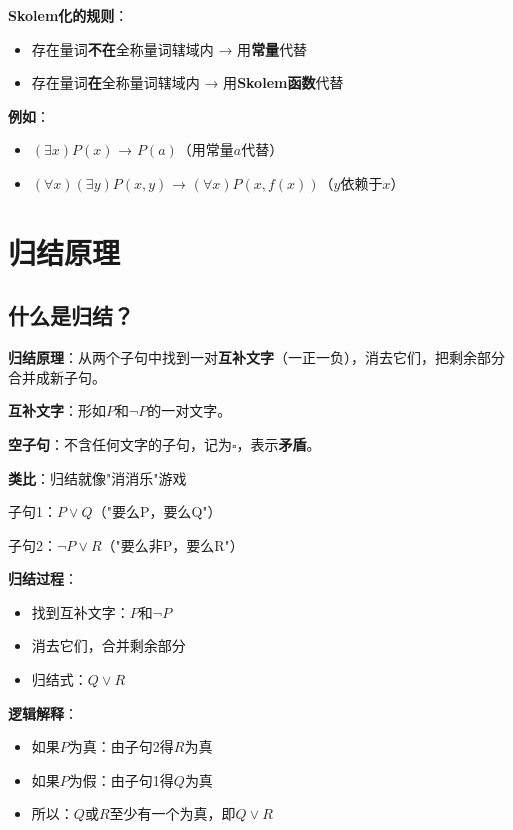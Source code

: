 \begin{tipbox}
\textbf{Skolem化的规则}：
\begin{itemize}[itemsep=0pt]
    \item 存在量词\textbf{不在}全称量词辖域内 → 用\textbf{常量}代替
    \item 存在量词\textbf{在}全称量词辖域内 → 用\textbf{Skolem函数}代替
\end{itemize}

\textbf{例如}：
\begin{itemize}[itemsep=0pt]
    \item $(\exists x)P(x)$ → $P(a)$（用常量$a$代替）
    \item $(\forall x)(\exists y)P(x,y)$ → $(\forall x)P(x,f(x))$（$y$依赖于$x$）
\end{itemize}
\end{tipbox}

\section{归结原理}

\subsection{什么是归结？}

\begin{conceptbox}
\textbf{归结原理}：从两个子句中找到一对\textbf{互补文字}（一正一负），消去它们，把剩余部分合并成新子句。

\textbf{互补文字}：形如$P$和$\neg P$的一对文字。

\textbf{空子句}：不含任何文字的子句，记为$\square$，表示\textbf{矛盾}。
\end{conceptbox}

\begin{examplebox}[例子：归结的直观理解]
\textbf{类比}：归结就像"消消乐"游戏

子句1：$P \lor Q$（"要么P，要么Q"）

子句2：$\neg P \lor R$（"要么非P，要么R"）

\textbf{归结过程}：
\begin{itemize}[itemsep=0pt]
    \item 找到互补文字：$P$和$\neg P$
    \item 消去它们，合并剩余部分
    \item 归结式：$Q \lor R$
\end{itemize}

\textbf{逻辑解释}：
\begin{itemize}[itemsep=0pt]
    \item 如果$P$为真：由子句2得$R$为真
    \item 如果$P$为假：由子句1得$Q$为真
    \item 所以：$Q$或$R$至少有一个为真，即$Q \lor R$
\end{itemize}
\end{examplebox}

